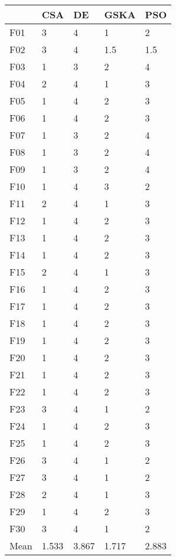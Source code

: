 \begin{tabular}{lllll}
\toprule
{} &    CSA &     DE &   GSKA &    PSO \\
\midrule
F01  &      3 &      4 &      1 &      2 \\
F02  &      3 &      4 &    1.5 &    1.5 \\
F03  &      1 &      3 &      2 &      4 \\
F04  &      2 &      4 &      1 &      3 \\
F05  &      1 &      4 &      2 &      3 \\
F06  &      1 &      4 &      2 &      3 \\
F07  &      1 &      3 &      2 &      4 \\
F08  &      1 &      3 &      2 &      4 \\
F09  &      1 &      3 &      2 &      4 \\
F10  &      1 &      4 &      3 &      2 \\
F11  &      2 &      4 &      1 &      3 \\
F12  &      1 &      4 &      2 &      3 \\
F13  &      1 &      4 &      2 &      3 \\
F14  &      1 &      4 &      2 &      3 \\
F15  &      2 &      4 &      1 &      3 \\
F16  &      1 &      4 &      2 &      3 \\
F17  &      1 &      4 &      2 &      3 \\
F18  &      1 &      4 &      2 &      3 \\
F19  &      1 &      4 &      2 &      3 \\
F20  &      1 &      4 &      2 &      3 \\
F21  &      1 &      4 &      2 &      3 \\
F22  &      1 &      4 &      2 &      3 \\
F23  &      3 &      4 &      1 &      2 \\
F24  &      1 &      4 &      2 &      3 \\
F25  &      1 &      4 &      2 &      3 \\
F26  &      3 &      4 &      1 &      2 \\
F27  &      3 &      4 &      1 &      2 \\
F28  &      2 &      4 &      1 &      3 \\
F29  &      1 &      4 &      2 &      3 \\
F30  &      3 &      4 &      1 &      2 \\
Mean &  1.533 &  3.867 &  1.717 &  2.883 \\
\bottomrule
\end{tabular}

